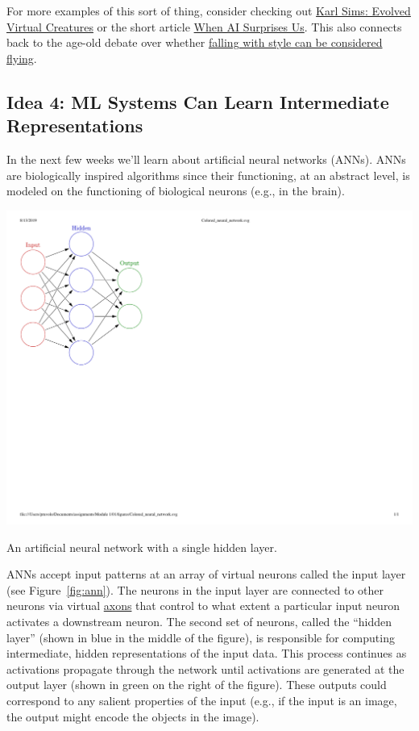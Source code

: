 \documentclass[assignment01_Solutions]{subfiles}
\begin{document}
For more examples of this sort of thing, consider checking out \href{https://www.youtube.com/watch?v=bBt0imn77Zg}{Karl Sims: Evolved Virtual Creatures} or the short article \href{https://aiweirdness.com/post/172894792687/when-algorithms-surprise-us}{When AI Surprises Us}.  This also connects back to the age-old debate over whether \href{https://www.youtube.com/watch?v=8M_1GAX3WcI}{falling with style can be considered flying}.


\subsection*{Idea 4: ML Systems Can Learn Intermediate Representations}

In the next few weeks we'll learn about artificial neural networks (ANNs).  ANNs are biologically inspired algorithms since their functioning, at an abstract level, is modeled on the functioning of biological neurons (e.g., in the brain).

\begin{marginfigure}
\includegraphics[width=\linewidth]{figures/Colored_neural_network}
\caption{An artificial neural network with a single hidden layer.}\label{fig:ann}
\end{marginfigure}
ANNs accept input patterns at an array of virtual neurons called the input layer (see Figure~\ref{fig:ann}).  The neurons in the input layer are connected to other neurons via virtual \href{https://en.wikipedia.org/wiki/Axon}{axons} that control to what extent a particular input neuron activates a downstream neuron.  The second set of neurons, called the ``hidden layer'' (shown in blue in the middle of the figure), is responsible for computing intermediate, hidden representations of the input data.  This process continues as activations propagate through the network until activations are generated at the output layer (shown in green on the right of the figure). These outputs could correspond to any salient properties of the input (e.g., if the input is an image, the output might encode the objects in the image).
\end{document}
